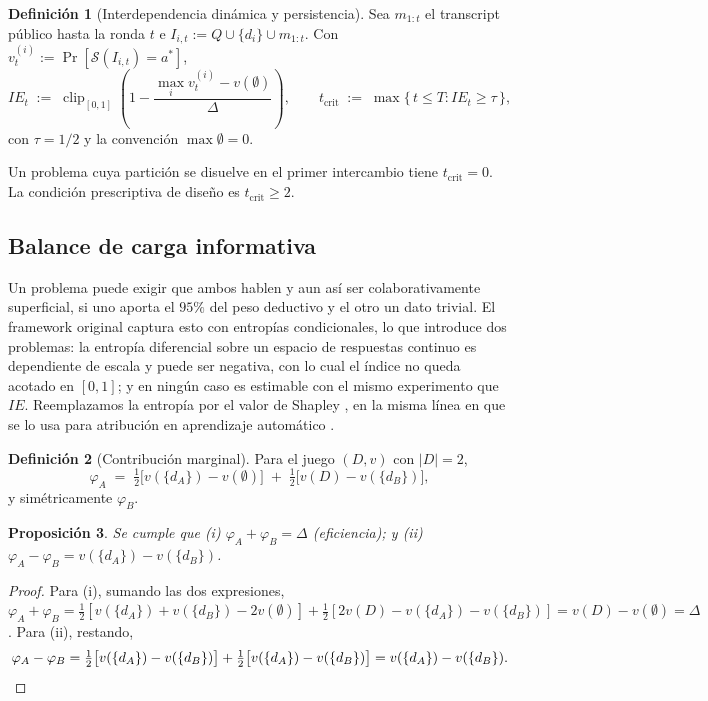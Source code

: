 \documentclass[11pt,a4paper]{article}
\theoremstyle{definition}
\newtheorem{definicion}{Definición}[section]
\theoremstyle{plain}
\newtheorem{proposicion}[definicion]{Proposición}
\theoremstyle{remark}
\newcommand{\solver}{\mathcal{S}}
\newcommand{\clip}{\operatorname{clip}}
\begin{document}
\begin{definicion}[Interdependencia dinámica y persistencia]
Sea $m_{1:t}$ el transcript público hasta la ronda $t$ e
$I_{i,t} := Q\cup\{d_i\}\cup m_{1:t}$. Con
$v_t^{(i)} := \Pr[\solver(I_{i,t})=a^\ast]$,
\[
  IE_t \;:=\; \clip_{[0,1]}\!\left(1-\frac{\max_i v_t^{(i)}-v(\emptyset)}{\Delta}\right),
  \qquad
  t_{\mathrm{crit}} \;:=\; \max\{\,t\le T : IE_t\ge \tau\,\},
\]
con $\tau=1/2$ y la convención $\max\emptyset=0$.
\end{definicion}

Un problema cuya partición se disuelve en el primer intercambio tiene
$t_{\mathrm{crit}}=0$. La condición prescriptiva de diseño es
$t_{\mathrm{crit}}\ge 2$.

\subsection{Balance de carga informativa}

Un problema puede exigir que ambos hablen y aun así ser colaborativamente
superficial, si uno aporta el $95\%$ del peso deductivo y el otro un dato trivial.
El framework original captura esto con entropías condicionales, lo que introduce
dos problemas: la entropía diferencial sobre un espacio de respuestas continuo es
dependiente de escala y puede ser negativa, con lo cual el índice no queda acotado
en $[0,1]$; y en ningún caso es estimable con el mismo experimento que $IE$.
Reemplazamos la entropía por el valor de Shapley \citep{shapley1953value}, en la
misma línea en que se lo usa para atribución en aprendizaje automático
\citep{lundberg2017unified}.

\begin{definicion}[Contribución marginal]
Para el juego $(D,v)$ con $|D|=2$,
\[
  \varphi_A \;=\; \tfrac12\big[v(\{d_A\})-v(\emptyset)\big] \;+\;
                  \tfrac12\big[v(D)-v(\{d_B\})\big],
\]
y simétricamente $\varphi_B$.
\end{definicion}

\begin{proposicion}\label{prop:ibc}
Se cumple que
\emph{(i)} $\varphi_A+\varphi_B=\Delta$ \emph{(eficiencia)}; y
\emph{(ii)} $\varphi_A-\varphi_B = v(\{d_A\})-v(\{d_B\})$.
\end{proposicion}

\begin{proof}
Para (i), sumando las dos expresiones,
$\varphi_A+\varphi_B=\tfrac12[v(\{d_A\})+v(\{d_B\})-2v(\emptyset)]
+\tfrac12[2v(D)-v(\{d_A\})-v(\{d_B\})]=v(D)-v(\emptyset)=\Delta$.
Para (ii), restando,
\[
\varphi_A-\varphi_B=\tfrac12\big[v(\{d_A\})-v(\{d_B\})\big]
+\tfrac12\big[v(\{d_A\})-v(\{d_B\})\big]=v(\{d_A\})-v(\{d_B\}). \qedhere
\]
\end{proof}
\end{document}
